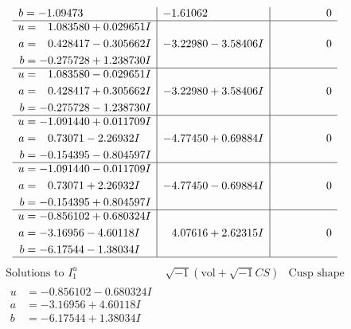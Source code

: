 \documentclass[1p]{elsarticle_modified}
\theoremstyle{definition}
\newcommand{\I}{\sqrt{-1}}
\begin{document}
$$\begin{array}{c|c|c}
\begin{aligned}
b &= -1.09473\phantom{ +0.000000I}\end{aligned}
 & -1.61062\phantom{ +0.000000I} & \phantom{-0.000000 } 0 \\ \hline\begin{aligned}
u &= \phantom{-}1.083580 + 0.029651 I \\
a &= \phantom{-}0.428417 - 0.305662 I \\
b &= -0.275728 + 1.238730 I\end{aligned}
 & -3.22980 - 3.58406 I & \phantom{-0.000000 } 0 \\ \hline\begin{aligned}
u &= \phantom{-}1.083580 - 0.029651 I \\
a &= \phantom{-}0.428417 + 0.305662 I \\
b &= -0.275728 - 1.238730 I\end{aligned}
 & -3.22980 + 3.58406 I & \phantom{-0.000000 } 0 \\ \hline\begin{aligned}
u &= -1.091440 + 0.011709 I \\
a &= \phantom{-}0.73071 - 2.26932 I \\
b &= -0.154395 - 0.804597 I\end{aligned}
 & -4.77450 + 0.69884 I & \phantom{-0.000000 } 0 \\ \hline\begin{aligned}
u &= -1.091440 - 0.011709 I \\
a &= \phantom{-}0.73071 + 2.26932 I \\
b &= -0.154395 + 0.804597 I\end{aligned}
 & -4.77450 - 0.69884 I & \phantom{-0.000000 } 0 \\ \hline\begin{aligned}
u &= -0.856102 + 0.680324 I \\
a &= -3.16956 - 4.60118 I \\
b &= -6.17544 - 1.38034 I\end{aligned}
 & \phantom{-}4.07616 + 2.62315 I & \phantom{-0.000000 } 0\\
 \hline 
 \end{array}$$\newpage$$\begin{array}{c|c|c}  
\text{Solutions to }I^u_{1}& \I (\text{vol} + \sqrt{-1}CS) & \text{Cusp shape}\\
 \hline 
\begin{aligned}
u &= -0.856102 - 0.680324 I \\
a &= -3.16956 + 4.60118 I \\
b &= -6.17544 + 1.38034 I\end{aligned}

\end{array}$$
\end{document}
